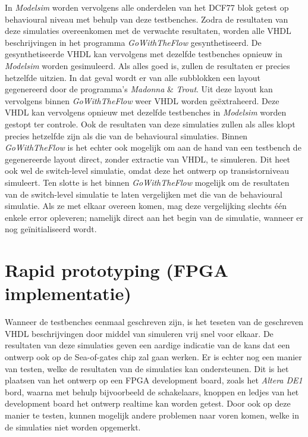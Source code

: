 \noindent In \emph{Modelsim} worden vervolgens alle onderdelen van het DCF77 blok getest op behavioural niveau met behulp van deze testbenches. Zodra de resultaten van deze simulaties overeenkomen met de verwachte resultaten, worden alle VHDL beschrijvingen in het programma \emph{GoWithTheFlow} gesynthetiseerd. De gesynthetiseerde VHDL kan vervolgens met dezelfde testbenches opnieuw in \emph{Modelsim} worden gesimuleerd. Als alles goed is, zullen de resultaten er precies hetzelfde uitzien. In dat geval wordt er van alle subblokken een layout gegenereerd door de programma's \emph{Madonna} \& \emph{Trout}. Uit deze layout kan vervolgens binnen \emph{GoWithTheFlow} weer VHDL worden ge\"extraheerd. Deze VHDL kan vervolgens opnieuw met dezelfde testbenches in \emph{Modelsim} worden gestopt ter controle. Ook de resultaten van deze simulaties zullen als alles klopt precies hetzelfde zijn als die van de behavioural simulaties. Binnen \emph{GoWithTheFlow} is het echter ook mogelijk om aan de hand van een testbench de gegenereerde layout direct, zonder extractie van VHDL, te simuleren. Dit heet ook wel de switch-level simulatie, omdat deze het ontwerp op transistorniveau simuleert. Ten slotte is het binnen \emph{GoWithTheFlow} mogelijk om de resultaten van de switch-level simulatie te laten vergelijken met die van de behavioural simulatie. Als ze met elkaar overeen komen, mag deze vergelijking slechts \'e\'en enkele error opleveren; namelijk direct aan het begin van de simulatie, wanneer er nog ge\"initialiseerd wordt.

\section{Rapid prototyping (FPGA implementatie)}
Wanneer de testbenches eenmaal geschreven zijn, is het teseten van de geschreven VHDL beschrijvingen door middel van simuleren vrij snel voor elkaar. De resultaten van deze simulaties geven een aardige indicatie van de kans dat een ontwerp ook op de Sea-of-gates chip zal gaan werken. Er is echter nog een manier van testen, welke de resultaten van de simulaties kan ondersteunen. Dit is het plaatsen van het ontwerp op een FPGA development board, zoals het \emph{Altera DE1} bord, waarna met behulp bijvoorbeeld de schakelaars, knoppen en ledjes van het development board het ontwerp realtime kan worden getest. Door ook op deze manier te testen, kunnen mogelijk andere problemen naar voren komen, welke in de simulaties niet worden opgemerkt.\\

